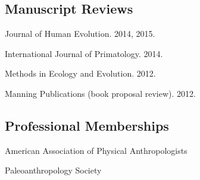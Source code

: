 \documentclass{article}
\begin{document}
\subsection*{Manuscript Reviews}
\begin{description*}
\item[] Journal of Human Evolution. 2014, 2015.
\item[] International Journal of Primatology. 2014.
\item[] Methods in Ecology and Evolution. 2012.
\item[] Manning Publications (book proposal review). 2012.
\end{description*}
\subsection*{Professional Memberships}
\begin{description*}
\item[] American Association of Physical Anthropologists
\item[] Paleoanthropology Society
\end{description*}
\end{document}
